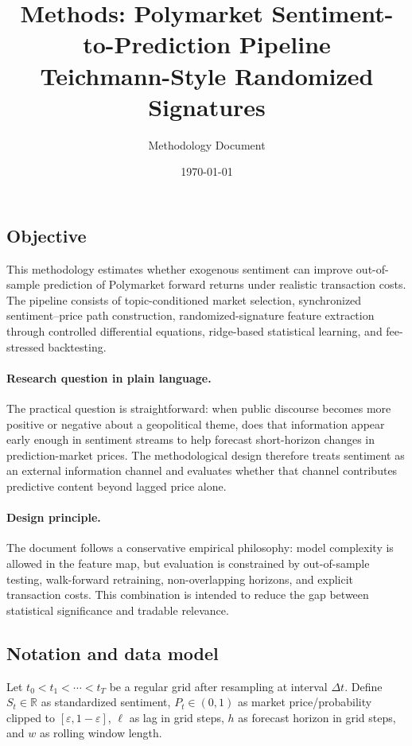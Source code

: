 \documentclass[11pt]{article}
\title{Methods: Polymarket Sentiment-to-Prediction Pipeline\\\large Teichmann-Style Randomized Signatures}
\author{Methodology Document}
\date{\today}
\begin{document}
\maketitle
\onehalfspacing

\subsection{Objective}
This methodology estimates whether exogenous sentiment can improve out-of-sample prediction of Polymarket forward returns under realistic transaction costs. The pipeline consists of topic-conditioned market selection, synchronized sentiment--price path construction, randomized-signature feature extraction through controlled differential equations, ridge-based statistical learning, and fee-stressed backtesting.
\paragraph{Research question in plain language.}
The practical question is straightforward: when public discourse becomes more positive or negative about a geopolitical theme, does that information appear early enough in sentiment streams to help forecast short-horizon changes in prediction-market prices. The methodological design therefore treats sentiment as an external information channel and evaluates whether that channel contributes predictive content beyond lagged price alone.
\paragraph{Design principle.}
The document follows a conservative empirical philosophy: model complexity is allowed in the feature map, but evaluation is constrained by out-of-sample testing, walk-forward retraining, non-overlapping horizons, and explicit transaction costs. This combination is intended to reduce the gap between statistical significance and tradable relevance.

\subsection{Notation and data model}
Let \(t_0 < t_1 < \cdots < t_T\) be a regular grid after resampling at interval \(\Delta t\).
Define \(S_t \in \mathbb{R}\) as standardized sentiment, \(P_t \in (0,1)\) as market price/probability clipped to \([\varepsilon,1-\varepsilon]\), \(\ell\) as lag in grid steps, \(h\) as forecast horizon in grid steps, and \(w\) as rolling window length.
\end{document}
